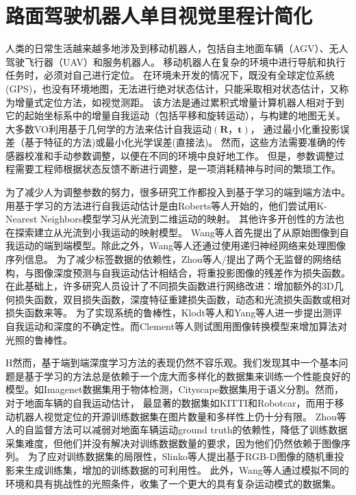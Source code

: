 \chapter{路面驾驶机器人单目视觉里程计简化}

人类的日常生活越来越多地涉及到移动机器人，包括自主地面车辆（AGV）、无人驾驶飞行器（UAV）和服务机器人。
移动机器人在复杂的环境中进行导航和执行任务时，必须对自己进行定位。
在环境未开发的情况下，既没有全球定位系统(GPS)，也没有环境地图，无法进行绝对状态估计，只能采取相对状态估计，又称为增量式定位方法，如视觉测距。
该方法是通过累积式增量计算机器人相对于到它的起始坐标系中的增量自我运动（包括平移和旋转运动），与构建的地图无关。
大多数VO利用基于几何学的方法来估计自我运动$(\mathbf{R}，\mathbf{t})$，
通过最小化重投影误差\cite{raul2015orb}（基于特征的方法)或最小化光学误差\cite{Engel-et-al-pami2018}(直接法)。
然而，这些方法需要准确的传感器校准和手动参数调整，以便在不同的环境中良好地工作\cite{roberts2008memory}。
但是，参数调整过程需要工程师根据状态反馈不断进行调整，是一项消耗精神与时间的繁琐工作。


为了减少人为调整参数的努力，很多研究工作都投入到基于学习的端到端方法中。
用基于学习的方法进行自我运动估计是由Roberts等人开始的\cite{roberts2008memory}，他们尝试用K-Nearest Neighbors模型学习从光流到二维运动的映射。 
其他许多开创性的方法也在探索建立从光流到小我运动的映射模型\cite{guizilini2012semi,costante2016exploring,pillai2017towards,costante2018ls}。
Wang等人\cite{wang2017deepvo,wang2018end}首先提出了从原始图像到自我运动的端到端模型。除此之外，Wang等人还通过使用递归神经网络来处理图像序列信息。
为了减少标签数据的依赖性，Zhou等人/\cite{zhou2017unsupervised}提出了两个无监督的网络结构，与图像深度预测与自我运动估计相结合，将重投影图像的残差作为损失函数。
在此基础上，许多研究人员设计了不同损失函数进行网络改进：增加额外的3D几何损失函数\cite{mahjourian2018unsupervised}，双目损失函数\cite{li2018undeepvo}，深度特征重建损失函数\cite{zhan2018unsupervised}，动态和光流损失函数\cite{yin2018geonet}或相对损失函数\cite{almalioglu2019ganvo}来等。
为了实现系统的鲁棒性，Klodt等人\cite{klodt2018supervising}和Yang等人\cite{yang2020d3vo}进一步提出测评自我运动和深度的不确定性。而Clement等人\cite{clement2018train}则试图用图像转换模型来增加算法对光照的鲁棒性。


H然而，基于端到端深度学习方法的表现仍然不容乐观。我们发现其中一个基本问题是基于学习的方法总是依赖于一个庞大而多样化的数据集来训练一个性能良好的模型。如Imagenet数据集\cite{deng2009imagenet}用于物体检测，Cityscape数据集\cite{Cordts2016Cityscapes}用于语义分割。然而，对于地面车辆的自我运动估计，
最显著的数据集如KITTI\cite{geiger2012kitti}和Robotcar\cite{RobotCarDatasetIJRR}，而用于移动机器人视觉定位的开源训练数据集在图片数量和多样性上仍十分有限。
Zhou等人的自监督方法\cite{zhou2017unsupervised}可以减弱对地面车辆运动ground truth的依赖性，降低了训练数据采集难度，但他们并没有解决对训练数据数量的要求，因为他们仍然依赖于图像序列。
为了应对训练数据集的局限性，Slinko等人\cite{slinko2019training}提出基于RGB-D图像的随机重投影来生成训练集，增加的训练数据的可利用性。
此外，Wang等人\cite{wang2020tartanair}通过模拟不同的环境和具有挑战性的光照条件，收集了一个更大的具有复杂运动模式的数据集。


